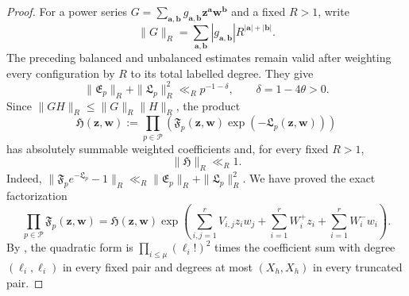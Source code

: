\documentclass[oneside, 12pt]{amsart}
\theoremstyle{definition}
\begin{document}
\begin{proof}
{			For a power series
			$G=\sum_{\mathbf a,\mathbf b}g_{\mathbf a,\mathbf b}
			\mathbf z^{\mathbf a}\mathbf w^{\mathbf b}$ and a fixed $R>1$, write
			\[
			\|G\|_R=\sum_{\mathbf a,\mathbf b}|g_{\mathbf a,\mathbf b}|
			R^{|\mathbf a|+|\mathbf b|}.
			\]
			The preceding balanced and unbalanced estimates remain valid after
			weighting every configuration by $R$ to its total labelled degree.
			They give
			\begin{equation}\label{weightedLocalCompletionRemainder}
				\|\mathfrak E_p\|_R+\|\mathfrak L_p\|_R^2
				\ll_Rp^{-1-\delta},
				\qquad \delta=1-4\theta>0.
			\end{equation}
			Since $\|GH\|_R\leq\|G\|_R\|H\|_R$, the product
			\[
			\mathfrak H(\mathbf z,\mathbf w)
			:=\prod_{p\in\mathcal P}\left(
			\mathfrak F_p(\mathbf z,\mathbf w)
			\exp(-\mathfrak L_p(\mathbf z,\mathbf w))\right)
			\]
			has absolutely summable weighted coefficients and, for every fixed $R>1$,
			\begin{equation}\label{singleBlockAnalyticRemainderBound}
				\|\mathfrak H\|_R\ll_R1.
			\end{equation}
			Indeed,
			$\|\mathfrak F_pe^{-\mathfrak L_p}-1\|_R
			\ll_R\|\mathfrak E_p\|_R+\|\mathfrak L_p\|_R^2$.
			We have proved the exact factorization
			\begin{equation}\label{singleBlockExactCompletion}
				\prod_{p\in\mathcal P}\mathfrak F_p(\mathbf z,\mathbf w)
				=\mathfrak H(\mathbf z,\mathbf w)
				\exp\left(
				\sum_{i,j=1}^rV_{i,j}z_iw_j
				+\sum_{i=1}^rW_i^+z_i
				+\sum_{i=1}^rW_i^-w_i
				\right).
			\end{equation}
			By , the quadratic form is
			$\prod_{i\leq\mu}(\ell_i!)^2$ times the coefficient sum with degree
			$(\ell_i,\ell_i)$ in every fixed pair and degrees at most $(X_h,X_h)$
			in every truncated pair.
			
}
\end{proof}
\end{document}
